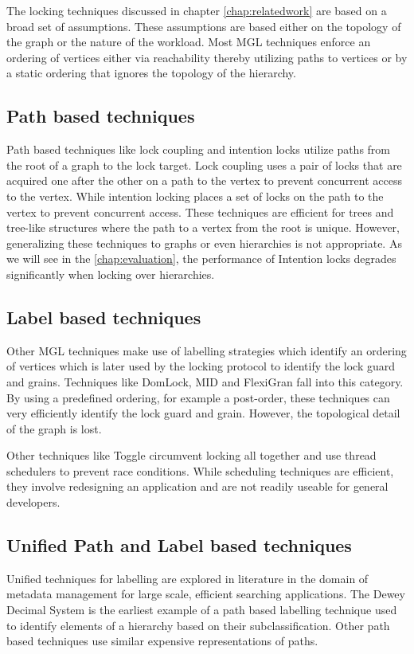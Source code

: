 The locking techniques discussed in chapter \ref{chap:relatedwork} are based on a broad set of assumptions. These assumptions are based either on the topology of the graph or the nature of the workload. Most MGL techniques enforce an ordering of vertices either via reachability thereby utilizing paths to vertices or by a static ordering that ignores the topology of the hierarchy.

\subsection{Path based techniques}
Path based techniques like lock coupling \cite{DBLP:journals/acta/BayerS77}  and intention locks \cite{gray1975granularity} utilize paths from the root of a graph to the lock target. Lock coupling uses a pair of locks that are acquired one after the other on a path to the vertex to prevent concurrent access to the vertex. While intention locking places a set of locks on the path to the vertex to prevent concurrent access. These techniques are efficient for trees and tree-like structures where the path to a vertex from the root is unique. However, generalizing these techniques to graphs or even hierarchies is not appropriate. As we will see in the \ref{chap:evaluation}, the performance of Intention locks degrades significantly when locking over hierarchies.

\subsection{Label based techniques}
Other MGL techniques make use of labelling strategies which identify an ordering of vertices which is later used by the locking protocol to identify the lock guard and grains. Techniques like DomLock, MID and FlexiGran fall into this category. By using a predefined ordering, for example a post-order, these techniques can very efficiently identify the lock guard and grain. However, the topological detail of the graph is lost.  

Other techniques like Toggle \cite{kalikar_toggle_2019} circumvent locking all together and use thread schedulers to prevent race conditions. While scheduling techniques are efficient, they involve redesigning an application and are not readily useable for general developers. 

\subsection{Unified Path and Label based techniques}
Unified techniques for labelling are explored in literature in the domain of metadata management for large scale, efficient searching applications. The Dewey Decimal System \cite{DBLP:journals/jd/Sweeney83} is the earliest example of a path based labelling technique used to identify elements of a hierarchy based on their subclassification. Other path based techniques use similar expensive representations of paths. 

